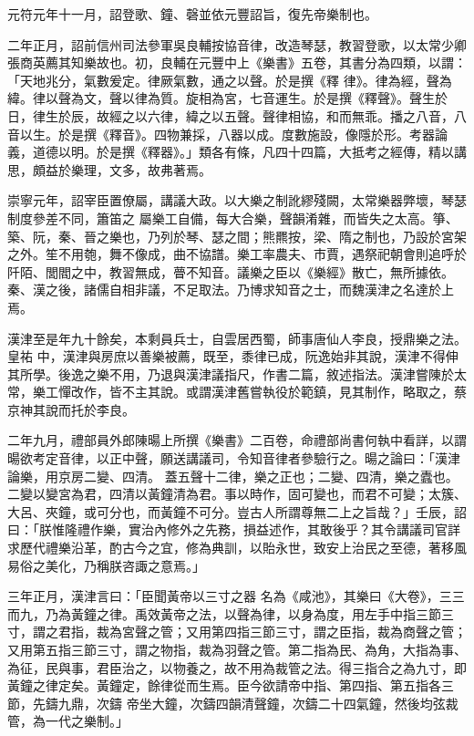 \begin{pinyinscope}
 元符元年十一月，詔登歌、鐘、磬並依元豐詔旨，復先帝樂制也。



 二年正月，詔前信州司法參軍吳良輔按協音律，改造琴瑟，教習登歌，以太常少卿張商英薦其知樂故也。初，良輔在元豐中上《樂書》五卷，其書分為四類，以謂：「天地兆分，氣數爰定。律厥氣數，通之以聲。於是撰《釋
 律》。律為經，聲為緯。律以聲為文，聲以律為質。旋相為宮，七音運生。於是撰《釋聲》。聲生於日，律生於辰，故經之以六律，緯之以五聲。聲律相協，和而無乖。播之八音，八音以生。於是撰《釋音》。四物兼採，八器以成。度數施設，像隱於形。考器論義，道德以明。於是撰《釋器》。」類各有條，凡四十四篇，大抵考之經傳，精以講思，頗益於樂理，文多，故弗著焉。



 崇寧元年，詔宰臣置僚屬，講議大政。以大樂之制訛繆殘闕，太常樂器弊壞，琴瑟制度參差不同，簫笛之
 屬樂工自備，每大合樂，聲韻淆雜，而皆失之太高。箏、築、阮，秦、晉之樂也，乃列於琴、瑟之間；熊羆按，梁、隋之制也，乃設於宮架之外。笙不用匏，舞不像成，曲不協譜。樂工率農夫、市賈，遇祭祀朝會則追呼於阡陌、閭閻之中，教習無成，瞢不知音。議樂之臣以《樂經》散亡，無所據依。秦、漢之後，諸儒自相非議，不足取法。乃博求知音之士，而魏漢津之名達於上焉。



 漢津至是年九十餘矣，本剩員兵士，自雲居西蜀，師事唐仙人李良，授鼎樂之法。皇祐
 中，漢津與房庶以善樂被薦，既至，黍律已成，阮逸始非其說，漢津不得伸其所學。後逸之樂不用，乃退與漢津議指尺，作書二篇，敘述指法。漢津嘗陳於太常，樂工憚改作，皆不主其說。或謂漢津舊嘗執役於範鎮，見其制作，略取之，蔡京神其說而托於李良。



 二年九月，禮部員外郎陳暘上所撰《樂書》二百卷，命禮部尚書何執中看詳，以謂暘欲考定音律，以正中聲，願送講議司，令知音律者參驗行之。暘之論曰：「漢津論樂，用京房二變、四清。
 蓋五聲十二律，樂之正也；二變、四清，樂之蠹也。二變以變宮為君，四清以黃鐘清為君。事以時作，固可變也，而君不可變；太簇、大呂、夾鐘，或可分也，而黃鐘不可分。豈古人所謂尊無二上之旨哉？」壬辰，詔曰：「朕惟隆禮作樂，實治內修外之先務，損益述作，其敢後乎？其令講議司官詳求歷代禮樂沿革，酌古今之宜，修為典訓，以貽永世，致安上治民之至德，著移風易俗之美化，乃稱朕咨諏之意焉。」



 三年正月，漢津言曰：「臣聞黃帝以三寸之器
 名為《咸池》，其樂曰《大卷》，三三而九，乃為黃鐘之律。禹效黃帝之法，以聲為律，以身為度，用左手中指三節三寸，謂之君指，裁為宮聲之管；又用第四指三節三寸，謂之臣指，裁為商聲之管；又用第五指三節三寸，謂之物指，裁為羽聲之管。第二指為民、為角，大指為事、為征，民與事，君臣治之，以物養之，故不用為裁管之法。得三指合之為九寸，即黃鐘之律定矣。黃鐘定，餘律從而生焉。臣今欲請帝中指、第四指、第五指各三節，先鑄九鼎，次鑄
 帝坐大鐘，次鑄四韻清聲鐘，次鑄二十四氣鐘，然後均弦裁管，為一代之樂制。」




\end{pinyinscope}
